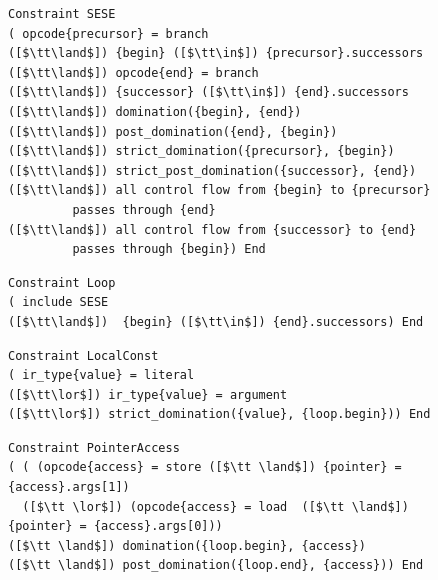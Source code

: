 \begin{figure}[p]
\begin{lstlisting}[language=CAnDL,basicstyle=\linespread{0.96}\ttfamily,
                   label={CAnDLSESE},caption=
   {Single entry single exit region in CAnDL:
    The region spans from {\tt begin} to {\tt end}, with the entry as control
    flow {\tt precursor} to {\tt begin}, and the exit as control flow {\tt end}
    to {\tt successor}.\parfillskip=0pt}]
Constraint SESE
( opcode{precursor} = branch
([$\tt\land$]) {begin} ([$\tt\in$]) {precursor}.successors
([$\tt\land$]) opcode{end} = branch
([$\tt\land$]) {successor} ([$\tt\in$]) {end}.successors
([$\tt\land$]) domination({begin}, {end})
([$\tt\land$]) post_domination({end}, {begin})
([$\tt\land$]) strict_domination({precursor}, {begin})
([$\tt\land$]) strict_post_domination({successor}, {end})
([$\tt\land$]) all control flow from {begin} to {precursor}
         passes through {end}
([$\tt\land$]) all control flow from {successor} to {end}
         passes through {begin}) End
\end{lstlisting}
\begin{lstlisting}[language=CAnDL,basicstyle=\linespread{0.96}\ttfamily,
                   label={CAnDLLoop},caption=
   {Loops are defined in CAnDL as single entry single exit regions with a back
    edge.
    The back edge does not break the ``single exit'' condition, because it does
    not exit the region.\parfillskip=0pt}]
Constraint Loop
( include SESE
([$\tt\land$])  {begin} ([$\tt\in$]) {end}.successors) End
\end{lstlisting}
\begin{lstlisting}[language=CAnDL,basicstyle=\linespread{0.96}\ttfamily,
                   label={localconstant},caption=
   {This specification restricts {\tt value} to remain constant during the
    execution of a loop.
    It is underspecified on its own, and should be included in larger CAnDL
    programs that also include {\tt Loop}, renaming {\tt value} to the specific
    variable that needs to be constrained in this way. \parfillskip=0pt}]
Constraint LocalConst
( ir_type{value} = literal
([$\tt\lor$]) ir_type{value} = argument
([$\tt\lor$]) strict_domination({value}, {loop.begin})) End
\end{lstlisting}
\begin{lstlisting}[language=CAnDL,basicstyle=\linespread{0.96}\ttfamily,
                   label={fig:arrayloop},caption=
   {Building blocks are combined to restrict the permitted memory access within
    a loop. \leftskip=0pt\rightskip=0pt}]
Constraint PointerAccess
( ( (opcode{access} = store ([$\tt \land$]) {pointer} = {access}.args[1])
  ([$\tt \lor$]) (opcode{access} = load  ([$\tt \land$]) {pointer} = {access}.args[0]))
([$\tt \land$]) domination({loop.begin}, {access})
([$\tt \land$]) post_domination({loop.end}, {access})) End


\end{lstlisting}
\end{figure}
